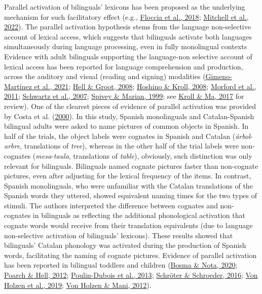 \documentclass[
]{article}
\begin{document}
Parallel activation of bilinguals' lexicons has been proposed as the
underlying mechanism for such facilitatory effect (e.g.,
\protect\hyperlink{ref-floccia2018introduction}{Floccia et al., 2018};
\protect\hyperlink{ref-mitchell2022cognates}{Mitchell et al., 2022}).
The parallel activation hypothesis stems from the language non-selective
account of lexical access, which suggests that bilinguals activate both
languages simultaneously during language processing, even in fully
monolingual contexts Evidence with adult bilinguals supporting the
language-non selective account of lexical access has been reported for
language comprehension and production, across the auditory and visual
(reading and signing) modalities
(\protect\hyperlink{ref-gimeno-martinez2021crosslinguistic}{Gimeno-Martínez
et al., 2021}; \protect\hyperlink{ref-vanhell2008sentence}{Hell \&
Groot, 2008}; \protect\hyperlink{ref-hoshino2008cognate}{Hoshino \&
Kroll, 2008}; \protect\hyperlink{ref-morford2011when}{Morford et al.,
2011}; \protect\hyperlink{ref-schwartz2007reading}{Schwartz et al.,
2007}; \protect\hyperlink{ref-spivey1999cross}{Spivey \& Marian, 1999};
see \protect\hyperlink{ref-kroll2017bilingual}{Kroll \& Ma, 2017} for
review). One of the clearest pieces of evidence of parallel activation
was provided by Costa et al.
(\protect\hyperlink{ref-costa2000cognate}{2000}). In this study, Spanish
monolinguals and Catalan-Spanish bilingual adults were asked to name
pictures of common objects in Spanish. In half of the trials, the object
labels were cognates in Spanish and Catalan (\emph{árbol}-\emph{arbre},
translations of \emph{tree}), whereas in the other half of the trial
labels were non-cognates (\emph{mesa}-\emph{taula}, translations of
\emph{table}), obviously, such distinction was only relevant for
bilinguals. Bilinguals named cognate pictures faster than non-cognate
pictures, even after adjusting for the lexical frequency of the items.
In contrast, Spanish monolinguals, who were unfamiliar with the Catalan
translations of the Spanish words they uttered, showed equivalent naming
times for the two types of stimuli. The authors interpreted the
difference between cognates and non-cognates in bilinguals as reflecting
the additional phonological activation that cognate words would receive
from their translation equivalents (due to language non-selective
activation of bilinguals' lexicons). These results showed that
bilinguals' Catalan phonology was activated during the production of
Spanish words, facilitating the naming of cognate pictures. Evidence of
parallel activation has been reported in bilingual toddlers and children
(\protect\hyperlink{ref-bosma2020cognate}{Bosma \& Nota, 2020};
\protect\hyperlink{ref-poarch2012crosslanguage}{Poarch \& Hell, 2012};
\protect\hyperlink{ref-poulin-dubois2013lexical}{Poulin-Dubois et al.,
2013}; \protect\hyperlink{ref-schroter2016orthographic}{Schröter \&
Schroeder, 2016}; \protect\hyperlink{ref-vonholzen2019impact}{Von Holzen
et al., 2019}; \protect\hyperlink{ref-vonholzen2012language}{Von Holzen
\& Mani, 2012}).
\end{document}

